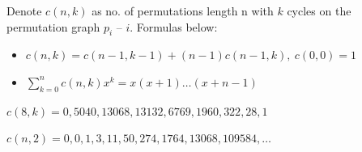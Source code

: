 Denote $c(n, k)$ as no. of permutations length n with $k$ cycles on the permutation graph $p_i$ -- $i$. Formulas below:
\begin{itemize}
    \item $c(n, k) = c(n - 1, k - 1) + (n - 1)c(n - 1, k),\ c(0, 0) = 1$
    
    \item $\displaystyle \sum_{k = 0}^n c(n, k)x^k = x(x + 1) \dots (x + n - 1)$
\end{itemize}
$c(8, k) = 0, 5040, 13068, 13132, 6769, 1960, 322, 28, 1$

$c(n, 2) = 0, 0, 1, 3, 11, 50, 274, 1764, 13068, 109584, \dots$